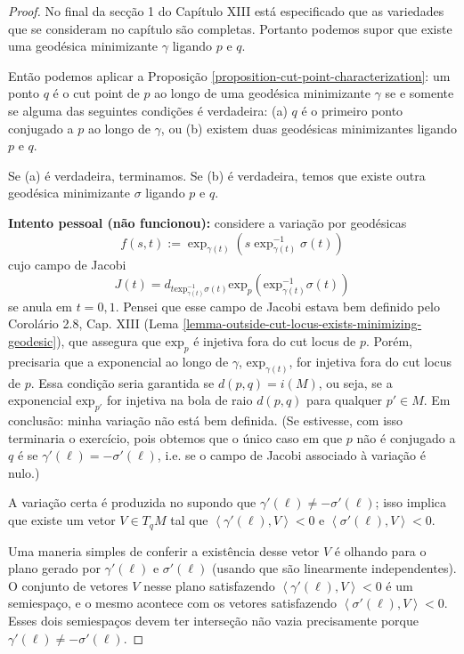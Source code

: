 \begin{proof}
No final da secção 1 do Capítulo XIII está especificado que as variedades que se
consideram no capítulo são completas. Portanto podemos supor que existe
uma geodésica minimizante $\gamma$ ligando $p$ e $q$.

Então podemos aplicar a Proposição \ref{proposition-cut-point-characterization}:
 um ponto $q$ é o cut point de $p$ ao longo de uma 
geodésica minimizante $\gamma$ se e somente se
alguma das seguintes condições é verdadeira: 
(a) $q$ é o primeiro ponto conjugado a $p$ ao longo de $\gamma$, ou 
(b) existem duas geodésicas minimizantes ligando $p$ e $q$.

Se (a) é verdadeira, terminamos. Se (b) é verdadeira, temos que existe outra
geodésica minimizante $\sigma$ ligando $p$ e $q$.

{\bf Intento pessoal (não funcionou):}  considere a variação por geodésicas 
$$
f(s,t):=\operatorname{exp}_{\gamma(t)}
(s\operatorname{exp}_{\gamma(t)}^{-1}\sigma(t))
$$
cujo campo de Jacobi 
$$
J(t)=d_{t\text{exp}_{\gamma(t)}^{-1}\sigma(t)}
\text{exp}_p(\text{exp}_{\gamma(t)}^{-1}\sigma(t))
$$
se anula em $t=0,1$. Pensei que esse campo de Jacobi estava bem definido pelo 
Corolário 2.8, Cap. XIII (Lema 
\ref{lemma-outside-cut-locus-exists-minimizing-geodesic}), que assegura
 que $\text{exp}_p$ é injetiva fora do cut locus de $p$. Porém, precisaria
 que a exponencial ao longo de $\gamma$,
 $\text{exp}_{\gamma(t)}$, for injetiva fora do cut locus de $p$. 
Essa condição seria garantida se $d(p,q)=i(M)$, ou seja, se a exponencial
 $\text{exp}_{p'}$ for injetiva na bola de raio $d(p,q)$ para qualquer 
$p' \in M$. Em conclusão: minha variação não está bem definida. 
(Se estivesse, com
isso terminaria o exercício, pois obtemos que o único caso em que $p$ não é
conjugado a $q$ é se $\gamma'(\ell)=-\sigma'(\ell)$, i.e. se o campo de Jacobi 
associado à variação é nulo.) 

\medskip

A variação certa é produzida no \cite{doc} supondo que 
$\gamma'(\ell)\neq -\sigma'(\ell)$; isso implica que existe um vetor
 $V \in T_q M$ tal que 
$\left<\gamma'(\ell),V\right>< 0$ e $\left<\sigma'(\ell),V\right>< 0$.

Uma maneria simples de conferir a existência desse vetor $V$ é olhando para o 
plano gerado por $\gamma'(\ell)$ e $\sigma'(\ell)$ (usando que são linearmente
independentes). O conjunto de vetores $V$ nesse plano satisfazendo 
$\left<\gamma'(\ell),V\right><0$ é um semiespaço, e o mesmo acontece com 
 os vetores satisfazendo $\left<\sigma'(\ell),V\right><0$. Esses dois semiespaços
devem ter interseção não vazia precisamente porque 
$\gamma'(\ell)\neq -\sigma'(\ell)$.


\end{proof}

